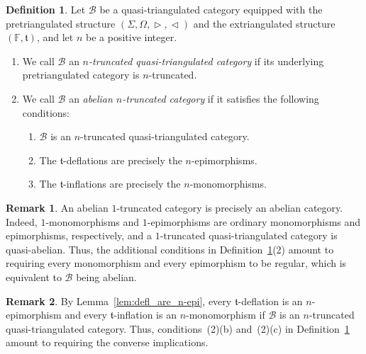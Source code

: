 \documentclass[a4paper,reqno,10pt]{amsart}
\theoremstyle{definition}
\newtheorem{definition}[definition]{Definition}
\theoremstyle{definition}
\newtheorem{remark}[remark]{Remark}
\theoremstyle{definition}
\theoremstyle{definition}
\theoremstyle{plain}
\newcommand{\ft}{\mathfrak{t}}
\newcommand{\BF}{\mathbb{F}}
\newcommand{\CB}{\mathcal{B}}
\begin{document}
\begin{definition}
\label{def:abel_n_trun_cat}
Let $\CB$ be a quasi-triangulated category equipped with the
pretriangulated structure
$(\Sigma,\Omega,\vartriangleright,\vartriangleleft)$
and the extriangulated structure $(\BF,\ft)$, and let $n$ be a
positive integer.
\begin{enumerate}
    \item We call $\CB$ an \emph{$n$-truncated quasi-triangulated
    category} if its underlying pretriangulated category is
    $n$-truncated.

    \item We call $\CB$ an \emph{abelian $n$-truncated category} if it satisfies the following
    conditions:
    \begin{enumerate}
        \item $\CB$ is an $n$-truncated quasi-triangulated category.
        \item The $\ft$-deflations are precisely the
        $n$-epimorphisms.
        \item The $\ft$-inflations are precisely the
        $n$-monomorphisms.
    \end{enumerate}
\end{enumerate}
\end{definition}

\color{blue}

\begin{remark}
\label{rem:abel_1_trun}
An abelian $1$-truncated category is precisely an abelian category.
Indeed, $1$-monomorphisms and $1$-epimorphisms are ordinary
monomorphisms and epimorphisms, respectively, and a $1$-truncated
quasi-triangulated category is quasi-abelian. Thus, the additional
conditions in Definition~\ref{def:abel_n_trun_cat}\textnormal{(2)}
amount to requiring every monomorphism and every epimorphism to be
regular, which is equivalent to $\CB$ being abelian.
\end{remark}

\normalcolor

\begin{remark}
By Lemma~\ref{lem:defl_are_n-epi}, every $\ft$-deflation is an
$n$-epimorphism and every $\ft$-inflation is an $n$-monomorphism if $\CB$ is an $n$-truncated quasi-triangulated category. 
Thus, conditions~\textnormal{(2)(b)} and~\textnormal{(2)(c)} in
Definition~\ref{def:abel_n_trun_cat} amount to requiring the
converse implications.
\end{remark}
\end{document}
